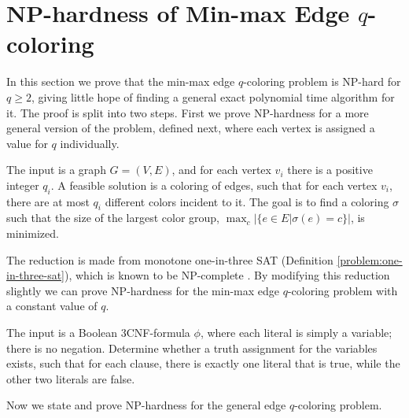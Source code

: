 \documentclass[runningheads, a4paper]{llncs}
\begin{document}
\section{NP-hardness of Min-max Edge $q$-coloring}\label{sect:mmenphard}

In this section we prove that the min-max edge $q$-coloring problem is NP-hard for $q \geq 2$, giving little hope of finding a general exact polynomial time algorithm for it. The proof is split into two steps. First we prove NP-hardness for a more general version of the problem, defined next, where each vertex is assigned a value for $q$ individually.

\begin{problem}\label{problem:general-mme}

The input is a graph $G = (V,E)$, and for each vertex $v_i$ there is a positive integer $q_i$. A feasible solution is a coloring of edges, such that for each vertex $v_i$, there are at most $q_i$ different colors incident to it. The goal is to find a coloring $\sigma$ such that the size of the largest color group, $\displaystyle\max_c |\{ e \in E | \sigma(e) = c \}|$, is minimized.
\end{problem}

The reduction is made from monotone one-in-three SAT (Definition \ref{problem:one-in-three-sat}), which is known to be NP-complete \cite{schaefer1978}. By modifying this reduction slightly we can prove NP-hardness for the min-max edge $q$-coloring problem with a constant value of $q$.

\begin{definition}\label{problem:one-in-three-sat}

The input is a Boolean 3CNF-formula $\phi$, where each literal is simply a variable; there is no negation. Determine whether a truth assignment for the variables exists, such that for each clause, there is exactly one literal that is true, while the other two literals are false.
\end{definition}

Now we state and prove NP-hardness for the general edge $q$-coloring problem.
\end{document}
